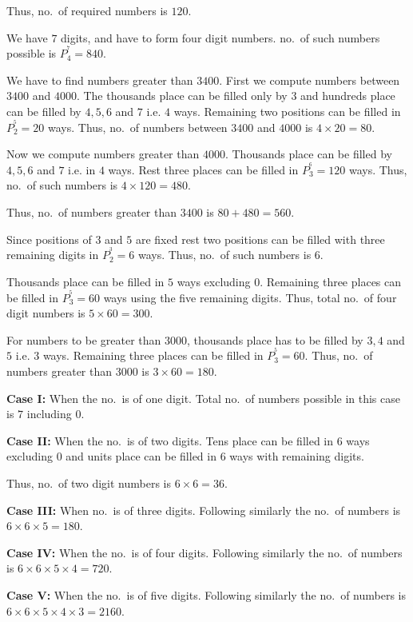  Thus, no.\ of required numbers is $120$.
\item We have $7$ digits, and have to form four digit numbers. no.\ of such numbers possible is $P_4^^7 =
  840$.

  We have to find numbers greater than $3400$. First we compute numbers between $3400$ and $4000$. The
  thousands place can be filled only by $3$ and hundreds place can be filled by $4, 5, 6$ and $7$ i.e. $4$
  ways. Remaining two positions can be filled in $P_2^^5 = 20$ ways. Thus, no.\ of numbers between $3400$
  and $4000$ is $4\times20 = 80$.

  Now we compute numbers greater than $4000$. Thousands place can be filled by $4, 5, 6$ and $7$ i.e. in
  $4$ ways. Rest three places can be filled in $P_3^^6 = 120$ ways. Thus, no.\ of such numbers is $4\times120
  = 480$.

  Thus, no.\ of numbers greater than $3400$ is $80 + 480 = 560$.
\item Since positions of $3$ and $5$ are fixed rest two positions can be filled with three remaining digits
  in $P_2^^3 = 6$ ways. Thus, no.\ of such numbers is $6$.
\item Thousands place can be filled in $5$ ways excluding $0$. Remaining three places can be filled in
  $P_3^^5 = 60$ ways using the five remaining digits. Thus, total no.\ of four digit numbers is $5\times60 =
  300$.

  For numbers to be greater than $3000$, thousands place has to be filled by $3, 4$ and $5$ i.e. $3$
  ways. Remaining three places can be filled in $P_3^^5 = 60$. Thus, no.\ of numbers greater than $3000$ is
  $3\times60 = 180$.
\item {\bf Case I:} When the no.\ is of one digit. Total no.\ of numbers possible in this case is $7$
  including $0$.

  {\bf Case II:} When the no.\ is of two digits. Tens place can be filled in $6$ ways excluding $0$ and units
  place can be filled in $6$ ways with remaining digits.

  Thus, no.\ of two digit numbers is $6\times6 = 36$.

  {\bf Case III:} When no.\ is of three digits. Following similarly the no.\ of numbers is $6\times6\times5 =
  180$.

  {\bf Case IV:} When the no.\ is of four digits. Following similarly the no.\ of numbers is
  $6\times6\times5\times4 = 720$.

  {\bf Case V:} When the no.\ is of five digits. Following similarly the no.\ of numbers is
  $6\times6\times5\times4\times3 = 2160$.


